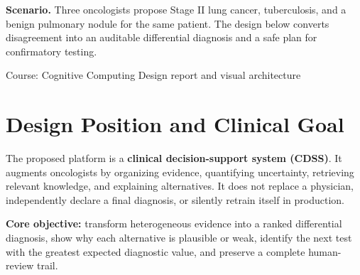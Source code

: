 \documentclass[11pt,a4paper]{article}
\begin{document}
\begin{titlepage}
\vfill
\begin{tcolorbox}[colback=navy!82!black,colframe=white!30,coltext=white,boxrule=.6pt,arc=2mm]
\textbf{Scenario.} Three oncologists propose Stage II lung cancer, tuberculosis, and a benign pulmonary nodule for the same patient. The design below converts disagreement into an auditable differential diagnosis and a safe plan for confirmatory testing.
\end{tcolorbox}
\vspace{8mm}
{\small Course: Cognitive Computing \hfill Design report and visual architecture\par}
\end{titlepage}
\pagecolor{white}
\color{ink}
\tableofcontents
\newpage

\section{Design Position and Clinical Goal}

The proposed platform is a \textbf{clinical decision-support system (CDSS)}. It augments oncologists by organizing evidence, quantifying uncertainty, retrieving relevant knowledge, and explaining alternatives. It does not replace a physician, independently declare a final diagnosis, or silently retrain itself in production.

\begin{keybox}
\textbf{Core objective:} transform heterogeneous evidence into a ranked differential diagnosis, show why each alternative is plausible or weak, identify the next test with the greatest expected diagnostic value, and preserve a complete human-review trail.
\end{keybox}
\end{document}
